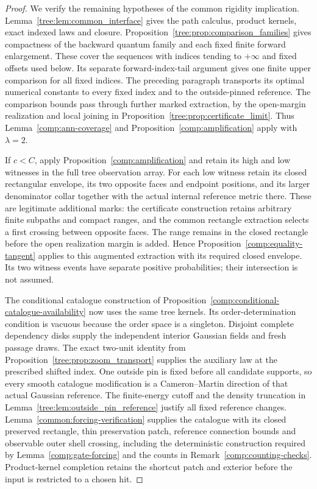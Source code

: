 \begin{proof}
We verify the remaining hypotheses of the common rigidity implication.
Lemma~\ref{tree:lem:common_interface} gives the path calculus, product
kernels, exact indexed laws and closure. Proposition~\ref{tree:prop:comparison_families}
gives compactness of the backward quantum family and each fixed
finite forward enlargement. These cover the sequences with indices
tending to $+\infty$ and fixed offsets used below. Its separate
forward-index-tail argument gives one finite upper comparison for
all fixed indices. The preceding paragraph transports its optimal numerical
constants to every fixed index and to the outside-pinned reference.
The comparison bounds pass through further marked extraction, by the
open-margin realization and local joining in
Proposition~\ref{tree:prop:certificate_limit}. Thus
Lemma~\ref{comp:ann-coverage} and Proposition~\ref{comp:amplification}
apply with $\lambda=2$.

If $c<C$, apply Proposition~\ref{comp:amplification} and retain its
high and low witnesses in the full tree observation array.
For each low witness retain its closed rectangular envelope, its two
opposite faces and endpoint positions, and its larger denominator
collar together with the actual internal reference metric there.
These are legitimate additional marks: the certificate construction
retains arbitrary finite subpaths and compact ranges, and the common
rectangle extraction selects a first crossing between opposite faces.
The range remains in the closed rectangle before the open realization
margin is added. Hence Proposition~\ref{comp:equality-tangent} applies
to this augmented extraction with its required closed envelope.
Its two witness events have separate positive probabilities; their
intersection is not assumed.

The conditional catalogue construction of
Proposition~\ref{comp:conditional-catalogue-availability} now uses the
same tree kernels. Its order-determination condition is vacuous because
the order space is a singleton. Disjoint complete dependency disks
supply the independent interior Gaussian fields and fresh passage
draws. The exact two-unit identity from
Proposition~\ref{tree:prop:zoom_transport} supplies the auxiliary law
at the prescribed shifted index. One outside pin is fixed before
all candidate supports, so every smooth catalogue modification is a
Cameron--Martin direction of that actual Gaussian reference.
The finite-energy cutoff and the density truncation in
Lemma~\ref{tree:lem:outside_pin_reference} justify all fixed reference
changes. Lemma~\ref{common:forcing-verification} supplies the catalogue
with its closed preserved rectangle, thin preservation patch, reference
connection bounds and observable outer shell crossing, including the
deterministic construction required by Lemma~\ref{comp:gate-forcing}
and the counts in Remark~\ref{comp:counting-checks}.
Product-kernel completion retains
the shortcut patch and exterior before the input is restricted to
a chosen hit.


\end{proof}
